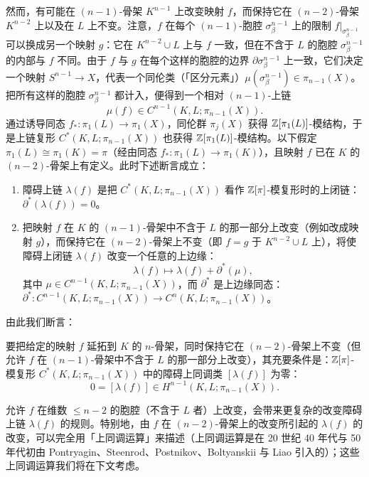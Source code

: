 
然而，有可能在 $(n-1)$-骨架 $K^{n-1}$ 上改变映射 $f$，而保持它在 $(n-2)$-骨架 $K^{n-2}$ 上以及在 $L$ 上不变。注意，$f$ 在每个 $(n-1)$-胞腔 $\sigma^{n-1}_\beta$ 上的限制 $f|_{\sigma^{n-1}_\beta}$ 可以换成另一个映射 $g$：它在 $K^{n-2}\cup L$ 上与 $f$ 一致，但在不含于 $L$ 的胞腔 $\sigma^{n-1}_\beta$ 的内部与 $f$ 不同。由于 $f$ 与 $g$ 在每个这样的胞腔的边界 $\partial\sigma^{n-1}_\beta$ 上一致，它们决定一个映射 $S^{n-1}\to X$，代表一个同伦类（「区分元素」）$\mu(\sigma^{n-1}_\beta)\in\pi_{n-1}(X)$。把所有这样的胞腔 $\sigma^{n-1}_\beta$ 都计入，便得到一个相对 $(n-1)$-上链
\[
\mu(f)\in C^{n-1}(K,L;\pi_{n-1}(X)).
\]
通过诱导同态 $f_*:\pi_1(L)\to\pi_1(X)$，同伦群 $\pi_j(X)$ 获得 $\mathbb{Z}[\pi_1(L)]$-模结构，于是上链复形 $C^*(K,L;\pi_{n-1}(X))$ 也获得 $\mathbb{Z}[\pi_1(L)]$-模结构。以下假定 $\pi_1(L)\cong\pi_1(K)=\pi$（经由同态 $f_*:\pi_1(L)\to\pi_1(K)$），且映射 $f$ 已在 $K$ 的 $(n-2)$-骨架上有定义。此时下述断言成立：

\begin{enumerate}[label=(\roman*),leftmargin=2.2em]
\item 障碍上链 $\lambda(f)$ 是把 $C^*(K,L;\pi_{n-1}(X))$ 看作 $\mathbb{Z}[\pi]$-模复形时的上闭链：$\partial^*(\lambda(f))=0$。
\item 把映射 $f$ 在 $K$ 的 $(n-1)$-骨架中不含于 $L$ 的那一部分上改变（例如改成映射 $g$），而保持它在 $(n-2)$-骨架上不变（即 $f=g$ 于 $K^{n-2}\cup L$ 上），将使障碍上闭链 $\lambda(f)$ 改变一个任意的上边缘：
\[
\lambda(f)\longmapsto\lambda(f)+\partial^*(\mu),
\]
其中 $\mu\in C^{n-1}(K,L;\pi_{n-1}(X))$，而 $\partial^*$ 是上边缘同态：$\partial^*:C^{n-1}(K,L;\pi_{n-1}(X))\to C^n(K,L;\pi_{n-1}(X))$。
\end{enumerate}

由此我们断言：

要把给定的映射 $f$ 延拓到 $K$ 的 $n$-骨架，同时保持它在 $(n-2)$-骨架上不变（但允许 $f$ 在 $(n-1)$-骨架中不含于 $L$ 的那一部分上改变），其充要条件是：$\mathbb{Z}[\pi]$-模复形 $C^*(K,L;\pi_{n-1}(X))$ 中的障碍上同调类 $[\lambda(f)]$ 为零：
\[
0=[\lambda(f)]\in H^{n-1}(K,L;\pi_{n-1}(X)).
\]

允许 $f$ 在维数 $\le n-2$ 的胞腔（不含于 $L$ 者）上改变，会带来更复杂的改变障碍上链 $\lambda(f)$ 的规则。特别地，由 $f$ 在 $(n-2)$-骨架上的改变所引起的 $\lambda(f)$ 的改变，可以完全用「上同调运算」来描述（上同调运算是在 20 世纪 40 年代与 50 年代初由 Pontryagin、Steenrod、Postnikov、Boltyanskii 与 Liao 引入的）；这些上同调运算我们将在下文考虑。

